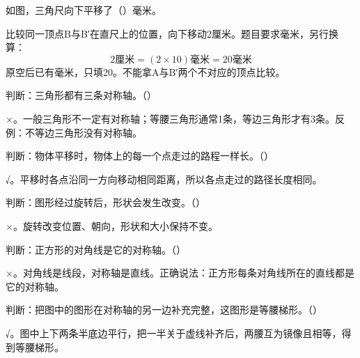 如图，三角尺向下平移了（\hspace{1.8em}）毫米。\par
{}
\begin{BookAnswer}
比较同一顶点B与B′在直尺上的位置，向下移动2厘米。题目要求毫米，另行换算：\[2\text{厘米}=(2\times10)\text{毫米}=20\text{毫米}\]原空后已有毫米，只填20。不能拿A与B′两个不对应的顶点比较。
\end{BookAnswer}

判断：三角形都有三条对称轴。（\hspace{1.8em}）\par
\begin{BookAnswer}
×。一般三角形不一定有对称轴；等腰三角形通常1条，等边三角形才有3条。反例：不等边三角形没有对称轴。
\end{BookAnswer}

判断：物体平移时，物体上的每一个点走过的路程一样长。（\hspace{1.8em}）\par
\begin{BookAnswer}
√。平移时各点沿同一方向移动相同距离，所以各点走过的路径长度相同。
\end{BookAnswer}

判断：图形经过旋转后，形状会发生改变。（\hspace{1.8em}）\par
\begin{BookAnswer}
×。旋转改变位置、朝向，形状和大小保持不变。
\end{BookAnswer}

判断：正方形的对角线是它的对称轴。（\hspace{1.8em}）\par
\begin{BookAnswer}
\(\times\)。对角线是线段，对称轴是直线。正确说法：正方形每条对角线所在的直线都是它的对称轴。
\end{BookAnswer}

判断：把图中的图形在对称轴的另一边补充完整，这图形是等腰梯形。（\hspace{1.8em}）\par
{}
\begin{BookAnswer}
√。图中上下两条半底边平行，把一半关于虚线补齐后，两腰互为镜像且相等，得到等腰梯形。
\end{BookAnswer}

